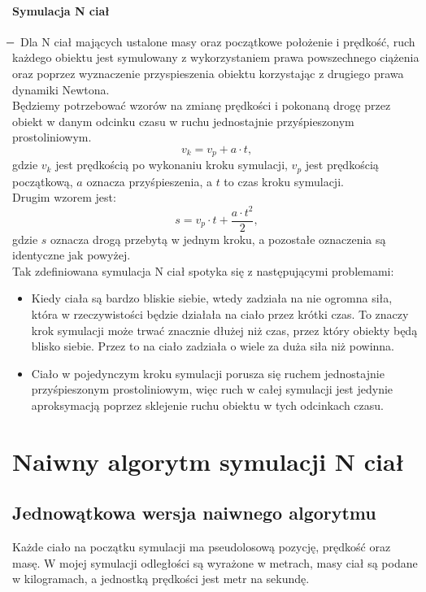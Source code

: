 \documentclass[14pt,twoside,a4paper]{article}
\theoremstyle{definition}
\begin{document}
\paragraph{Symulacja N ciał} 
\newcommand{\mi}{\boldsymbol{} \mathrel{\mkern -16mu} \boldsymbol{-}}
$\mi$
Dla N ciał mających ustalone masy oraz początkowe położenie i prędkość, ruch każdego obiektu jest symulowany z wykorzystaniem prawa powszechnego ciążenia oraz poprzez wyznaczenie przyspieszenia obiektu korzystając z drugiego prawa dynamiki Newtona.\\
\bigskip
Będziemy potrzebować wzorów na zmianę prędkości i pokonaną drogę przez obiekt w danym odcinku czasu w ruchu jednostajnie przyśpieszonym prostoliniowym.
$$v_k = v_p + a\cdot t,$$ gdzie $v_k$ jest prędkością po wykonaniu kroku symulacji, $v_p$ jest prędkością początkową, $a$ oznacza przyśpieszenia, a $t$ to czas kroku symulacji.\\
Drugim wzorem jest:
$$s = v_p\cdot t + \frac{a\cdot t^2}{2},$$ gdzie $s$ oznacza drogą przebytą w jednym kroku, a pozostałe oznaczenia są identyczne jak powyżej.\\


Tak zdefiniowana symulacja N ciał spotyka się z następującymi problemami:
\begin{itemize}
\item Kiedy ciała są bardzo bliskie siebie, wtedy zadziała na nie ogromna siła, która w rzeczywistości będzie działała na ciało przez krótki czas. To znaczy krok symulacji może trwać znacznie dłużej niż czas, przez który obiekty będą blisko siebie. Przez to na ciało zadziała o wiele za duża siła niż powinna.
\item Ciało w pojedynczym kroku symulacji porusza się ruchem jednostajnie przyśpieszonym prostoliniowym, więc ruch w całej symulacji jest jedynie aproksymacją poprzez sklejenie ruchu obiektu w tych odcinkach czasu.
\end{itemize}

\section{\LARGE Naiwny algorytm symulacji N ciał}
\bigskip

\subsection{\Large Jednowątkowa wersja naiwnego algorytmu}

Każde ciało na początku symulacji ma pseudolosową pozycję, prędkość oraz masę. W mojej symulacji odległości są wyrażone w metrach, masy ciał są podane w kilogramach, a jednostką prędkości jest metr na sekundę. \\
\end{document}

